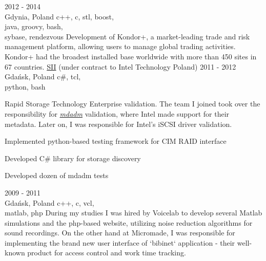\documentclass[a4paper,11pt]{cv4tw}%
\begin{document}
      {2012 - 2014\\Gdynia, Poland}
      {c++, c, stl, boost,\\java, groovy, bash,\\sybase, rendezvous}
      {Development of Kondor+, a market-leading trade and risk management platform,
        allowing users to manage global trading activities. Kondor+ had the broadest
        installed base worldwide with more than 450 sites in 67 countries.
      }
      {\href{https://sii.pl/en/}{SII} (under contract to Intel Technology Poland)}
      {2011 - 2012\\Gdańsk, Poland}
      {c\#, tcl,\\python, bash}
      {Rapid Storage Technology Enterprise validation. The team I joined took over the responsibility
        for \href{https://en.wikipedia.org/wiki/Mdadm}{\emph{mdadm}} validation, where Intel
        made support for their metadata. Later on, I was responsible for Intel's iSCSI driver validation.
        \begin{missions}
        \item Implemented python-based testing framework for CIM RAID interface
        \item Developed C\# library for storage discovery
        \item Developed dozen of mdadm tests
        \end{missions}
      }
      {2009 - 2011\\Gdańsk, Poland}
      {c++, c, vcl,\\matlab, php}
      {During my studies I was hired by Voicelab to develop several Matlab simulations and the php-based
        website, utilizing noise reduction algorithms for sound recordings. On the other hand at Micromade,
        I was responsible for implementing the brand new user interface of `bibinet` application - their well-known
        product for access control and work time tracking.
      }
\end{document}
